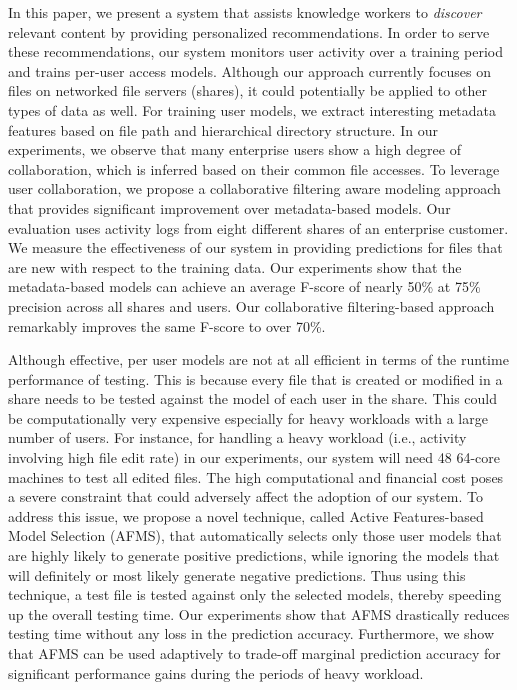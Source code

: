 In this paper, we present a system that assists knowledge workers to
\textit{discover} relevant content by providing personalized
recommendations.  In order to serve these recommendations, our system
monitors user activity over a training period and trains per-user
access models.  Although our approach currently focuses on files on
networked file servers (shares), it could potentially be applied to other types
of data as well.  For training user models, we extract interesting
metadata features based on file path and hierarchical directory
structure.  In our experiments, we observe that many enterprise users
show a high degree of collaboration, which is inferred based on their
common file accesses.  To leverage user collaboration, we propose a
collaborative filtering aware modeling approach that provides
significant improvement over metadata-based models.  Our evaluation
uses activity logs from eight different shares of an enterprise
customer.  We measure the effectiveness of our system in providing
predictions for files that are new with respect to the training data.
Our experiments show that the metadata-based models can achieve an
average F-score of nearly 50\% at 75\% precision across all shares and users.
Our collaborative filtering-based approach remarkably improves the
same F-score to over 70\%.

Although effective, per user models are not at all efficient in terms
of the runtime performance of testing.  This is because every file
that is created or modified in a share needs to be tested against the
model of each user in the share.  This could be computationally very expensive
especially for heavy workloads with a large number of users.  For
instance, for handling a heavy workload (i.e., activity
involving high file edit rate) in our experiments, our system will
need 48 64-core machines to test all edited files.  The high computational and financial cost poses a severe
constraint that could adversely affect the adoption of our system.  To
address this issue, we propose a novel technique, called Active
Features-based Model Selection (AFMS), that automatically selects only
those user models that are highly likely to generate positive
predictions, while ignoring the models that will definitely or most likely generate
negative predictions.  Thus using this technique, a test file is
tested against only the selected models, thereby speeding up the
overall testing time.  Our experiments show that AFMS drastically
reduces testing time without any loss in the prediction accuracy.
Furthermore, we show that AFMS can be used adaptively to trade-off
marginal prediction accuracy for significant performance gains during
the periods of heavy workload.


